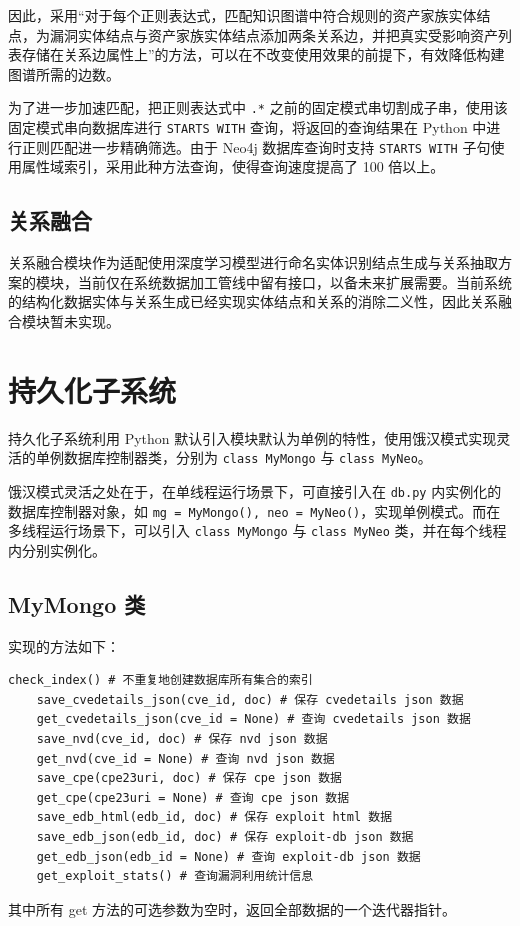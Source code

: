 \documentclass[a4paper,AutoFakeBold,oneside,12pt]{book}
\begin{document}
因此，采用“对于每个正则表达式，匹配知识图谱中符合规则的资产家族实体结点，为漏洞实体结点与资产家族实体结点添加两条关系边，并把真实受影响资产列表存储在关系边属性上”的方法，可以在不改变使用效果的前提下，有效降低构建图谱所需的边数。

为了进一步加速匹配，把正则表达式中 \lstinline|.*| 之前的固定模式串切割成子串，使用该固定模式串向数据库进行 \lstinline|STARTS WITH| 查询，将返回的查询结果在 Python 中进行正则匹配进一步精确筛选。由于 Neo4j 数据库查询时支持 \lstinline|STARTS WITH| 子句使用属性域索引，采用此种方法查询，使得查询速度提高了 100 倍以上。

\subsection{关系融合}

关系融合模块作为适配使用深度学习模型进行命名实体识别结点生成与关系抽取方案的模块，当前仅在系统数据加工管线中留有接口，以备未来扩展需要。当前系统的结构化数据实体与关系生成已经实现实体结点和关系的消除二义性，因此关系融合模块暂未实现。

\section{持久化子系统}

持久化子系统利用 Python 默认引入模块默认为单例的特性，使用饿汉模式\cite{}实现灵活的单例数据库控制器类，分别为 \lstinline|class MyMongo| 与 \lstinline|class MyNeo|。

饿汉模式灵活之处在于，在单线程运行场景下，可直接引入在 \lstinline|db.py| 内实例化的数据库控制器对象，如 \lstinline|mg = MyMongo(), neo = MyNeo()|，实现单例模式。而在多线程运行场景下，可以引入 \lstinline|class MyMongo| 与 \lstinline|class MyNeo| 类，并在每个线程内分别实例化。

\subsection{MyMongo 类}

实现的方法如下：
\begin{lstlisting}[style = python]
	check_index() # 不重复地创建数据库所有集合的索引
	save_cvedetails_json(cve_id, doc) # 保存 cvedetails json 数据
	get_cvedetails_json(cve_id = None) # 查询 cvedetails json 数据
	save_nvd(cve_id, doc) # 保存 nvd json 数据
	get_nvd(cve_id = None) # 查询 nvd json 数据
	save_cpe(cpe23uri, doc) # 保存 cpe json 数据
	get_cpe(cpe23uri = None) # 查询 cpe json 数据
	save_edb_html(edb_id, doc) # 保存 exploit html 数据
	save_edb_json(edb_id, doc) # 保存 exploit-db json 数据
	get_edb_json(edb_id = None) # 查询 exploit-db json 数据
	get_exploit_stats() # 查询漏洞利用统计信息
\end{lstlisting}
其中所有 get 方法的可选参数为空时，返回全部数据的一个迭代器指针。
\end{document}
